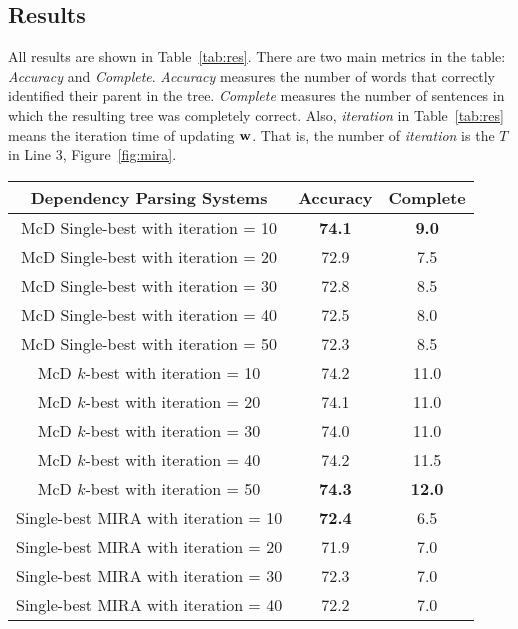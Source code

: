 \documentclass[12pt]{article}
\begin{document}
\subsection{Results}

All results are shown in Table~\ref{tab:res}. There are two main metrics in the table: \emph {Accuracy} and \emph {Complete}. \emph {Accuracy} measures the number of words that correctly identified their parent in the tree. \emph{Complete} measures the number of sentences in which the resulting tree was completely correct. Also, \emph {iteration} in Table~\ref{tab:res} means the iteration time of updating ${\bf w}$. That is, the number of \emph {iteration} is the $T$ in Line 3, Figure~\ref {fig:mira}. \\

\begin{table}[htb!]
  \begin{center}
    \begin{tabular}{|c|c|c|}
      \hline
{\bf Dependency Parsing Systems}     & {\bf Accuracy} & {\bf Complete} \\ \hline
McD Single-best with iteration = 10  & {\bf 74.1} & {\bf 9.0} \\ \hline
McD Single-best with iteration = 20  & 72.9     & 7.5      \\ \hline
McD Single-best with iteration = 30  & 72.8     & 8.5      \\ \hline
McD Single-best with iteration = 40  & 72.5     & 8.0      \\ \hline
McD Single-best with iteration = 50  & 72.3     & 8.5      \\ \hline
McD $k$-best with iteration = 10     & 74.2     & 11.0     \\ \hline
McD $k$-best with iteration = 20     & 74.1     & 11.0     \\ \hline
McD $k$-best with iteration = 30     & 74.0     & 11.0     \\ \hline
McD $k$-best with iteration = 40     & 74.2     & 11.5     \\ \hline
McD $k$-best with iteration = 50     & {\bf 74.3} & {\bf 12.0} \\ \hline
Single-best MIRA with iteration = 10 & {\bf 72.4} & 6.5    \\ \hline
Single-best MIRA with iteration = 20 & 71.9     & 7.0      \\ \hline
Single-best MIRA with iteration = 30 & 72.3     & 7.0      \\ \hline
Single-best MIRA with iteration = 40 & 72.2     & 7.0      \\ \hline

\end{tabular}
\end{center}
\end{table}
\end{document}
